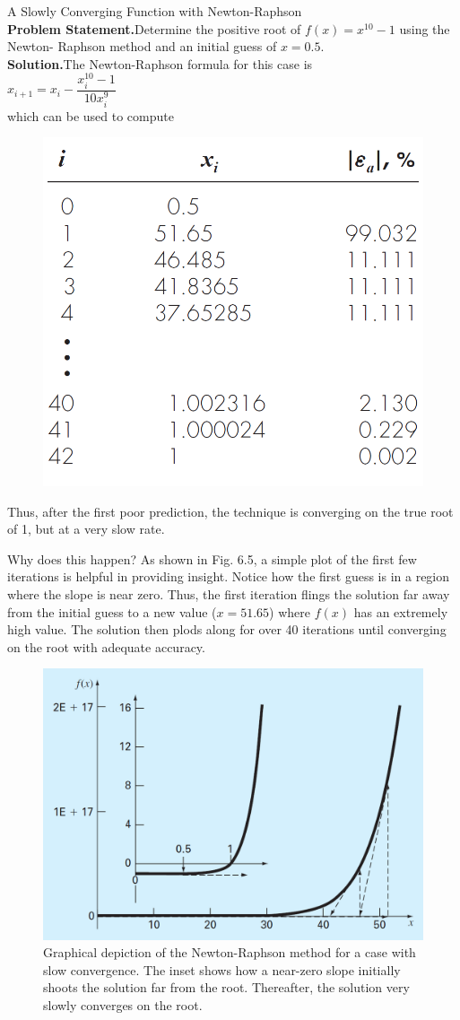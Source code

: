 \documentclass[../main.tex]{subfiles}
\begin{document}
\begin{example} A Slowly Converging Function with Newton-Raphson\\

    \noindent\textbf{Problem Statement.}\quad Determine the positive root of $f (x) = x^{10} - 1$ using the Newton-
    Raphson method and an initial guess of $x = 0.5$.\\

    \noindent\textbf{Solution.}\quad The Newton-Raphson formula for this case is\\
    
    $x_{i+1} = x_i - \dfrac{x^{10}_i - 1}{10x^9_i}$\\

    \noindent which can be used to compute\\

    \begin{figure}[h]
        \includegraphics[width=0.3\linewidth]{./images/example_6_3_1}
    \end{figure}

    \noindent Thus, after the first poor prediction, the technique is converging on the true root of 1, but
    at a very slow rate.

    Why does this happen? As shown in Fig. 6.5, a simple plot of the first few iterations is
    helpful in providing insight. Notice how the first guess is in a region where the slope is near
    zero. Thus, the first iteration flings the solution far away from the initial guess to a new
    value ($x = 51.65$) where $f (x)$ has an extremely high value. The solution then plods along
    for over 40 iterations until converging on the root with adequate accuracy.\\

    \begin{figure}[h]
        \includegraphics[width=0.6\linewidth]{./images/fig_6_5}
        \caption{Graphical depiction of the Newton-Raphson method for a case with slow convergence. The
        inset shows how a near-zero slope initially shoots the solution far from the root. Thereafter,
        the solution very slowly converges on the root.}
    \end{figure}
\end{example}
\end{document}
